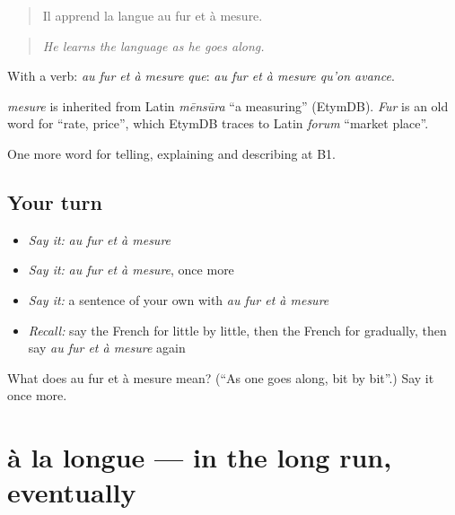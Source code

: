 \begin{quote}
Il apprend la langue au fur et à mesure.
\end{quote}

\begin{quote}
\emph{He learns the language as he goes along.}
\end{quote}

With a verb: \emph{au fur et à mesure que}: \emph{au fur et à mesure qu'on avance}.

\begin{cousinweb}
\emph{mesure} is inherited from Latin \emph{mēnsūra} \textquotedblleft{}a measuring\textquotedblright{} (EtymDB). \emph{Fur} is an old word for \textquotedblleft{}rate, price\textquotedblright{}, which EtymDB traces to Latin \emph{forum} \textquotedblleft{}market place\textquotedblright{}.
\end{cousinweb}

\begin{grammarlens}[title={What you've built}]
One more word for telling, explaining and describing at B1.
\end{grammarlens}

\subsection*{Your turn}
\begin{itemize}
\raggedright
  \item \emph{Say it:} \emph{au fur et à mesure}
  \item \emph{Say it:} \emph{au fur et à mesure}, once more
  \item \emph{Say it:} a sentence of your own with \emph{au fur et à mesure}
  \item \emph{Recall:} say the French for little by little, then the French for gradually, then say \emph{au fur et à mesure} again
\end{itemize}

\begin{tcolorbox}[breakable,colback=teal!4,colframe=teal!35!black,title={Before you move on}]
What does au fur et à mesure mean? (\textquotedblleft{}As one goes along, bit by bit\textquotedblright{}.) Say it once more.
\end{tcolorbox}
\section[à la longue]{à la longue — in the long run, eventually}

